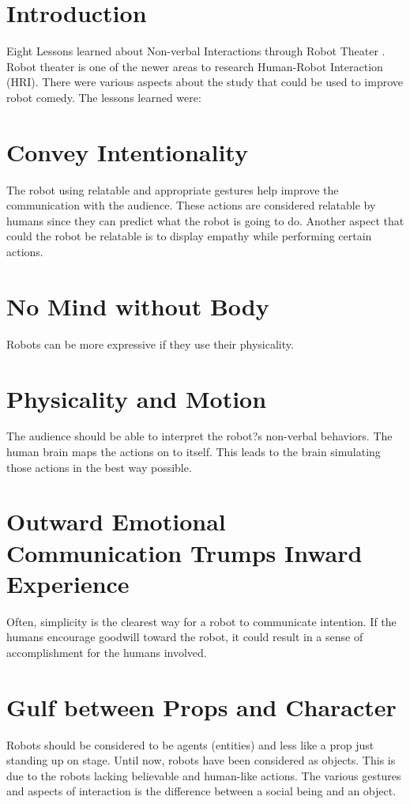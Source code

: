 \documentclass[onecolumn, draftclsnofoot,10pt, compsoc]{IEEEtran}
\begin{document}
\section{Introduction}
Eight Lessons learned about Non-verbal Interactions through Robot Theater \cite{KnightEightLessons:2011}.  Robot theater is one of the newer areas to research Human-Robot Interaction (HRI). There were various aspects about the study that could be used to improve robot comedy. The lessons learned were: 

\section{Convey Intentionality}
The robot using relatable and appropriate gestures help improve the communication with the audience. These actions are considered relatable by humans since they can predict what the robot is going to do. Another aspect that could the robot be relatable is to display empathy while performing certain actions.
	
\section{No Mind without Body}
	Robots can be more expressive if they use their physicality. 
	
\section{Physicality and Motion}
	The audience should be able to interpret the robot?s non-verbal behaviors. The human brain maps the actions on to itself. This leads to the brain simulating those actions in the best way possible.
	
\section{Outward Emotional Communication Trumps Inward Experience}
	Often, simplicity is the clearest way for a robot to communicate intention. If the humans encourage goodwill toward the robot, it could result in a sense of accomplishment for the humans involved.
	
\section{Gulf between Props and Character}
	Robots should be considered to be agents (entities) and less like a prop just standing up on stage. Until now, robots have been considered as objects. This is due to the robots lacking believable and human-like actions. The various gestures and aspects of interaction is the difference between a social being and an object.
	
\end{document}
